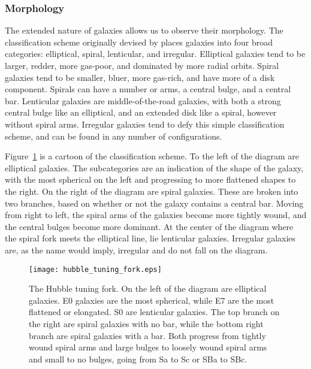 \subsubsection{Morphology}

The extended nature of galaxies allows us to observe their morphology.  The classification scheme originally devised by \citet{hubble_1926} places galaxies into four broad categories:  elliptical, spiral, lenticular, and irregular.  Elliptical galaxies tend to be larger, redder, more gas-poor, and dominated by more radial orbits.  Spiral galaxies tend to be smaller, bluer, more gas-rich, and have more of a disk component.  Spirals can have a number or arms, a central bulge, and a central bar.  Lenticular galaxies are middle-of-the-road galaxies, with both a strong central bulge like an elliptical, and an extended disk like a spiral, however without spiral arms.  Irregular galaxies tend to defy this simple classification scheme, and can be found in any number of configurations.

Figure~\ref{fig:tuning_fork} is a cartoon of the classification scheme.  To the left of the diagram are elliptical galaxies.  The subcategories are an indication of the shape of the galaxy, with the most spherical on the left and progressing to more flattened shapes to the right.  On the right of the diagram are spiral galaxies.  These are broken into two branches, based on whether or not the galaxy contains a central bar.  Moving from right to left, the spiral arms of the galaxies become more tightly wound, and the central bulges become more dominant.  At the center of the diagram where the spiral fork meets the elliptical line, lie lenticular galaxies.  Irregular galaxies are, as the name would imply, irregular and do not fall on the diagram.

\begin{figure}[t]
\centering
\texttt{[image: hubble\_tuning\_fork.eps]}
\caption[The Hubble tuning fork]{\footnotesize The Hubble tuning fork.  On the left of the diagram are elliptical galaxies.  E0 galaxies are the most spherical, while E7 are the most flattened or elongated.  S0 are lenticular galaxies.  The top branch on the right are spiral galaxies with no bar, while the bottom right branch are spiral galaxies with a bar.  Both progress from tightly wound spiral arms and large bulges to loosely wound spiral arms and small to no bulges, going from Sa to Sc or SBa to SBc.}
\label{fig:tuning_fork}
\end{figure}



